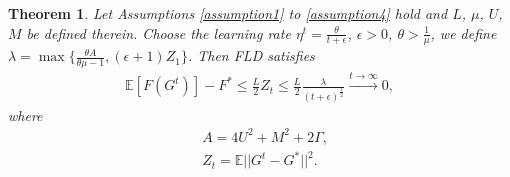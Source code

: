 

\newtheorem{thm}{Theorem}
\begin{thm}\label{thm1}
Let Assumptions \ref{assumption1} to \ref{assumption4} hold and $L$, $\mu$, $U$, $M$ be defined therein. Choose the learning rate $\eta^t=\frac{\theta}{t+\epsilon}$, $ \epsilon>0$, $\theta > \frac{1}{\mu}$, we define $\lambda=\max\{\frac{\theta A}{\theta \mu -1}, (\epsilon+1)Z_1\}$. Then FLD satisfies 
\begin{equation}
    \begin{split}
        \mathbb{E}[F(G^t)]-F^*
	\leq \frac{L}{2} Z_t 
	\leq \frac{L}{2}\frac{\lambda}{(t+\epsilon )^{\frac{1}{2}}}
	\stackrel{t \to \infty}{\longrightarrow}0,
    \end{split}
\end{equation}
where 
\begin{equation}
    \begin{split}
        & A=4U^2+M^2+2\Gamma, \\
        & Z_t=\mathbb{E}||G^t-G^*||^2.
    \end{split}
\end{equation}
\end{thm} 


